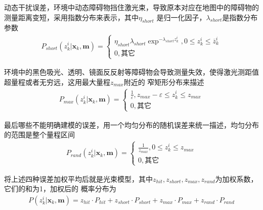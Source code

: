 \documentclass[10pt]{article}
\begin{document}
动态干扰误差，环境中动态障碍物挡住激光束，导致原本对应在地图中的障碍物的测量距离变短，采用指数分布来表示，其中$\eta_{short}$
是归一化因子，$\lambda_{short}$是指数分布参数
\begin{align} 
    P_{short}(z_{k}^{i} | \mathbf{x}_k, \mathbf{m}) = \left\{\begin{array}{l}\eta_{short}\lambda_{short}
    \exp^{-\lambda_{short}z_{k}^{i}},0\leq z_{k}^{i}\leq \overline{z}_{k}^{i} \\ 0,\text{其它}\end{array}
    \right. 
\end{align}

环境中的黑色吸光、透明、镜面反反射等障碍物会导致测量失效，使得激光测距值超量程或者无穷远，这用最大量程$z_{max}$附近的
窄矩形分布来描述
\begin{align}  
    P_{max}(z_{k}^{i} | \mathbf{x}_k,\mathbf{m})=\left\{\begin{array}{l}\frac{1}{\varepsilon},z_{max}
    -\varepsilon \leq z_{k}^{i} \leq z_{max} \\ 0,\text{其它} \end{array}\right.
\end{align}

最后哪些不能明确建模的误差，用一个均匀分布的随机误差来统一描述，均匀分布的范围是整个量程区间
\begin{align} 
    P_{rand}(z_{k}^{i} | \mathbf{x}_{k},\mathbf{m})=\left\{\begin{array}{l}\frac{1}{z_{max}},0\leq 
    z_{k}^{i} \leq z_{max} \\ 0,\text{其它}\end{array}\right.
\end{align}

将上述四种误差加权平均后就是光束模型，其中$z_{hit},z_{short},z_{max},z_{rand}$为加权系数，它们的和为1，加权后的
概率分布为
\begin{align} 
    P(z_{k}^{i} | \mathbf{x}_{k},\mathbf{m}) = z_{hit}\cdot P_{hit}+z_{short}\cdot P_{short}+
    z_{max}\cdot P_{max}+z_{rand}\cdot P_{rand}
\end{align}
\end{document}
